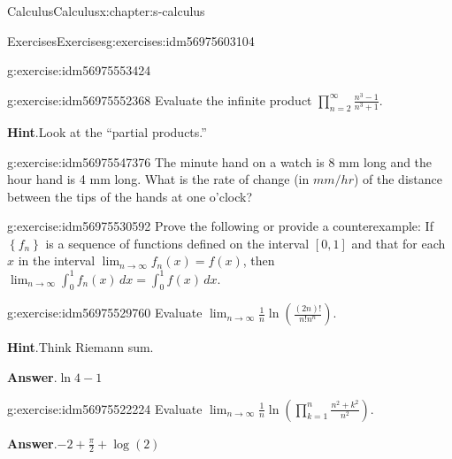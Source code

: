 \documentclass[twoside,10pt,]{book}
\newcommand{\blocktitlefont}{\relax}
\numberwithin{equation}{section}
\begin{document}
\begin{chapterptx}{Calculus}{}{Calculus}{}{}{x:chapter:s-calculus}
\begin{exercises-section}{Exercises}{}{Exercises}{}{}{g:exercises:idm56975603104}
\begin{divisionexercise}{10}{}{}{g:exercise:idm56975553424}
\end{divisionexercise}%
\begin{divisionexercise}{11}{}{}{g:exercise:idm56975552368}%
Evaluate the infinite product \(\prod _{n=2}^{\infty } \frac{n^3-1}{n^3+1}\).%
\par\smallskip%
\noindent\textbf{\blocktitlefont Hint}.\hypertarget{g:hint:idm56975548304}{}\quad{}Look at the ``partial products.''%
\end{divisionexercise}%
\begin{divisionexercise}{12}{}{}{g:exercise:idm56975547376}%
The minute hand on a watch is 8 mm long and the hour hand is 4 mm long. What is the rate of change (in \(mm/hr\)) of  the distance between the tips of the hands at one o’clock?%
\end{divisionexercise}%
\begin{divisionexercise}{13}{}{}{g:exercise:idm56975530592}%
Prove the following or provide a counterexample:  If \(\left\{f_n\right\}\) is a sequence of functions defined on the interval \([0,1]\) and that for each \(x\) in the interval \(\lim_{n\to \infty } f_n(x) = f(x)\),  then    \(\lim_{n\to \infty } \int_0^1 f_n(x) \, dx=\int_0^1 f(x)
\, dx\).%
\end{divisionexercise}%
\begin{divisionexercise}{14}{}{}{g:exercise:idm56975529760}%
Evaluate \(\lim_{n \rightarrow \infty} \frac{1}{n}\ln{\left(\frac{(2n)!}{n! n^n}\right)}\).%
\par\smallskip%
\noindent\textbf{\blocktitlefont Hint}.\hypertarget{g:hint:idm56975525664}{}\quad{}Think Riemann sum.%
\par\smallskip%
\noindent\textbf{\blocktitlefont Answer}.\hypertarget{g:answer:idm56975525328}{}\quad{}\(\ln{4}-1\)%
\end{divisionexercise}%
\begin{divisionexercise}{15}{}{}{g:exercise:idm56975522224}%
Evaluate \(\lim_{n \rightarrow \infty} \frac{1}{n}\ln \left(\prod_{k=1}^{n} \frac{ n^2+k^2}{n^2}\right)\).%
\par\smallskip%
\noindent\textbf{\blocktitlefont Answer}.\hypertarget{g:answer:idm56975520528}{}\quad{}\(-2+\frac{\pi }{2}+\log (2)\)%
\end{divisionexercise}%
\end{exercises-section}
\end{chapterptx}
%
%
\typeout{************************************************}
\typeout{************************************************}
%
\end{document}
